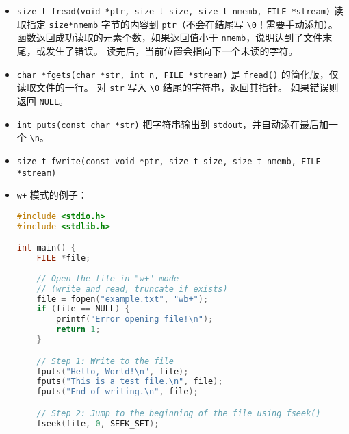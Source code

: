 \begin{itemize}
\begin{lstlisting}[language=cpp]
    // Move the file pointer to the start index
    fseek(file, start_ind, SEEK_SET);

    // Read the bytes from start_ind
    size_t bytesRead = fread(buffer, sizeof(char), length, file);

    // Null-terminate the buffer if any data was read
    if (bytesRead > 0)
        buffer[bytesRead] = '\0';

    // Check if we reached EOF
    if (feof(file))
        printf("End of file reached.\n");
    // Check for read errors
    else if (ferror(file))
        perror("Error reading file");

    // Print the string
    printf("Read string: %s\n", buffer);

    // Free the allocated memory and close the file
    free(buffer);
    fclose(file);

    return 0;
}
\end{lstlisting}
\item \verb`size_t fread(void *ptr, size_t size, size_t nmemb, FILE *stream)` 读取指定 \verb`size*nmemb` 字节的内容到 \verb`ptr`（不会在结尾写 \verb`\0`！需要手动添加）。 函数返回成功读取的元素个数，如果返回值小于 \verb`nmemb`，说明达到了文件末尾，或发生了错误。 读完后，当前位置会指向下一个未读的字符。
\item \verb`char *fgets(char *str, int n, FILE *stream)` 是 \verb`fread()` 的简化版，仅读取文件的一行。 对 \verb`str` 写入 \verb`\0` 结尾的字符串，返回其指针。 如果错误则返回 \verb`NULL`。
\item \verb`int puts(const char *str)` 把字符串输出到 \verb`stdout`，并自动添在最后加一个 \verb`\n`。
\item \verb`size_t fwrite(const void *ptr, size_t size, size_t nmemb, FILE *stream)`
\item \verb`w+` 模式的例子：
\begin{lstlisting}[language=cpp]
#include <stdio.h>
#include <stdlib.h>

int main() {
    FILE *file;
    
    // Open the file in "w+" mode
    // (write and read, truncate if exists)
    file = fopen("example.txt", "wb+");
    if (file == NULL) {
        printf("Error opening file!\n");
        return 1;
    }

    // Step 1: Write to the file
    fputs("Hello, World!\n", file);
    fputs("This is a test file.\n", file);
    fputs("End of writing.\n", file);

    // Step 2: Jump to the beginning of the file using fseek()
    fseek(file, 0, SEEK_SET);


\end{lstlisting}
\end{itemize}
